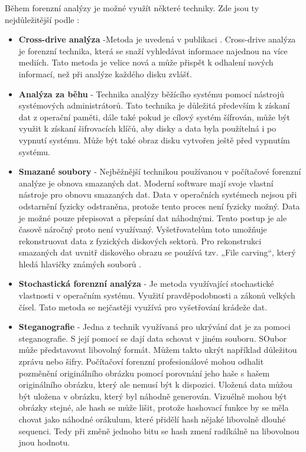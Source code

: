 \documentclass[thesis=B,czech]{FITthesis}[2012/06/26]
\begin{document}
Během forenzní analýzy je možné využít některé techniky. Zde jsou ty nejdůležitější podle \cite{for_w}:
\begin{itemize}
\item \textbf{Cross-drive analýza} -Metoda je uvedená v publikaci \cite{garfinkel2006forensic}. Cross-drive analýza je forenzní technika, která se snaží vyhledávat informace najednou na více mediích. Tato metoda je velice nová a může přispět k odhalení nových informací, než při analýze každého disku zvlášť.

\item \textbf{Analýza za běhu} - Technika analýzy běžícího systému pomocí nástrojů systémových administrátorů. Tato technika je důležitá především k získaní dat z operační paměti, dále také pokud je cílový systém šífrován, může být využit k získaní šifrovacích klíčů, aby disky a data byla použítelná i po vypnutí systému. Může být také obraz disku vytvořen ještě před vypnutím systému.

\item \textbf{Smazané soubory} - Nejběžnější technikou používanou v počítačové forenzní analýze je obnova smazaných dat. Moderní software mají svoje vlastní nástroje pro obnovu smazaných dat. Data v operačních systémech nejsou při odstarnění fyzicky odstraněna, protože tento proces není fyzicky možný. Data je možné pouze přepisovat a přepsání dat náhodnými. Tento postup je ale časově náročný proto není využívaný. Vyšetřovatelům toto umožňuje rekonstruovat data z fyzických diskových sektorů. Pro rekonstrukci smazaných dat uvnitř diskového obrazu se používá tzv. „File carving“, který hledá hlavičky známých souborů \cite{for_w}. 

\item \textbf{Stochastická forenzní analýza} - Je metoda využívající stochastické vlastnosti v operačním systému. Využití pravděpodobnosti a zákonů velkých čísel. Tato metoda se nejčastěji využívá pro vyšetřování krádeže dat.

\item \textbf{Steganografie} - Jedna z technik využívaná pro ukrývání dat je za pomoci steganografie. S její pomocí se dají data schovat v jiném souboru. SOubor může představovat libovolný formát. Můžem takto ukrýt například důležitou zprávu nebo šifry. Počítačoví forenzní profesionálové mohou odhalit pozměnění originálního obrázku pomocí porovnání jeho haše s hašem originálního obrázku, který ale nemusí být k dispozici. Uložená data můžou být uložena v obrázku, který byl náhodně generován. Vizuélně mohou být obrázky stejné, ale hash se může lišit, protože hashovací funkce by se měla chovat jako náhodné orákulum, které přidělí hash nějaké libovolně dlouhé sequenci. Tedy při změně jednoho bitu se hash zmení radíkálně na libovolnou jnou hodnotu.


\end{itemize}
\end{document}
